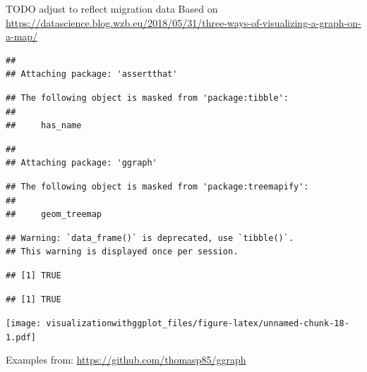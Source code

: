 \documentclass[]{krantz}
\begin{document}
TODO adjust to reflect migration data
Based on \url{https://datascience.blog.wzb.eu/2018/05/31/three-ways-of-visualizing-a-graph-on-a-map/}

\begin{verbatim}
## 
## Attaching package: 'assertthat'
\end{verbatim}

\begin{verbatim}
## The following object is masked from 'package:tibble':
## 
##     has_name
\end{verbatim}

\begin{verbatim}
## 
## Attaching package: 'ggraph'
\end{verbatim}

\begin{verbatim}
## The following object is masked from 'package:treemapify':
## 
##     geom_treemap
\end{verbatim}

\begin{verbatim}
## Warning: `data_frame()` is deprecated, use `tibble()`.
## This warning is displayed once per session.
\end{verbatim}

\begin{verbatim}
## [1] TRUE
\end{verbatim}

\begin{verbatim}
## [1] TRUE
\end{verbatim}

\texttt{[image: visualizationwithggplot\_files/figure-latex/unnamed-chunk-18-1.pdf]}

Examples from: \url{https://github.com/thomasp85/ggraph}
\end{document}
